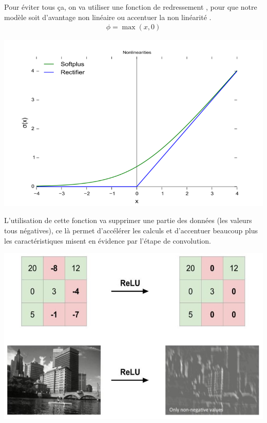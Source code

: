 Pour éviter tous ça, on va utiliser une fonction de redressement , pour que notre modèle soit d’avantage non linéaire ou accentuer la non linéarité \cite{glorot2011deep}.
\begin{eqnarray}
	\phi = \max (x, 0)
\end{eqnarray}

\begin{center}
	\includegraphics[scale=0.3]{img12.png}
\end{center}

L’utilisation de cette fonction va supprimer une partie des données (les valeurs tous négatives), ce là permet d’accélérer les calculs et d’accentuer beaucoup plus les caractéristiques misent  en évidence par l’étape de convolution. 

\begin{center}
	\includegraphics[scale=0.3]{img13.png}
\end{center}
\newpage
